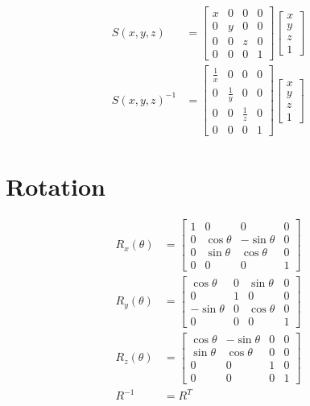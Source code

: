   \begin{align}
    S\left( x, y, z \right) &=
    \begin{bmatrix}
      x & 0 & 0 & 0 \\
      0 & y & 0 & 0 \\
      0 & 0 & z & 0 \\
      0 & 0 & 0 & 1
    \end{bmatrix}
    \begin{bmatrix}
      x \\
      y \\
      z \\
      1
    \end{bmatrix} \\
    S\left( x, y, z \right)^{-1} &=
    \begin{bmatrix}
      \frac{1}{x} & 0 & 0 & 0 \\
      0 & \frac{1}{y} & 0 & 0 \\
      0 & 0 & \frac{1}{z} & 0 \\
      0 & 0 & 0 & 1
    \end{bmatrix}
    \begin{bmatrix}
      x \\
      y \\
      z \\
      1
    \end{bmatrix}
  \end{align}

\section{Rotation}

  \begin{align}
    R_{x}\left( \theta \right) &=
    \begin{bmatrix}
      1 & 0 & 0 & 0 \\
      0 & \cos\theta & -\sin\theta & 0 \\
      0 & \sin\theta & \cos\theta & 0 \\
      0 & 0 & 0 & 1
    \end{bmatrix} \\
    R_{y}\left( \theta \right) &=
    \begin{bmatrix}
      \cos\theta & 0 & \sin\theta & 0 \\
      0 & 1 & 0 & 0 \\
      -\sin\theta & 0 & \cos\theta & 0 \\
      0 & 0 & 0 & 1
    \end{bmatrix} \\
    R_{z}\left( \theta \right) &=
    \begin{bmatrix}
      \cos\theta & -\sin\theta & 0 & 0 \\
      \sin\theta & \cos\theta & 0 & 0 \\
      0 & 0 & 1 & 0 \\
      0 & 0 & 0 & 1
    \end{bmatrix} \\
    R^{-1} &= R^{T}
  \end{align}

